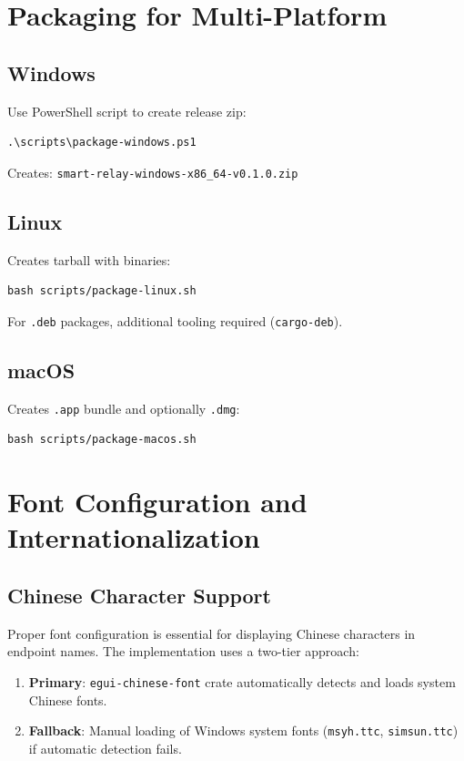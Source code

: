 \section{Packaging for Multi-Platform}

\subsection{Windows}

Use PowerShell script to create release zip:
\begin{verbatim}
.\scripts\package-windows.ps1
\end{verbatim}

Creates: \texttt{smart-relay-windows-x86\_64-v0.1.0.zip}

\subsection{Linux}

Creates tarball with binaries:
\begin{verbatim}
bash scripts/package-linux.sh
\end{verbatim}

For \texttt{.deb} packages, additional tooling required (\texttt{cargo-deb}).

\subsection{macOS}

Creates \texttt{.app} bundle and optionally \texttt{.dmg}:
\begin{verbatim}
bash scripts/package-macos.sh
\end{verbatim}

\section{Font Configuration and Internationalization}

\subsection{Chinese Character Support}

Proper font configuration is essential for displaying Chinese characters in endpoint names. The implementation uses a two-tier approach:

\begin{enumerate}
    \item \textbf{Primary}: \texttt{egui-chinese-font} crate automatically detects and loads system Chinese fonts.
    \item \textbf{Fallback}: Manual loading of Windows system fonts (\texttt{msyh.ttc}, \texttt{simsun.ttc}) if automatic detection fails.
\end{enumerate}

